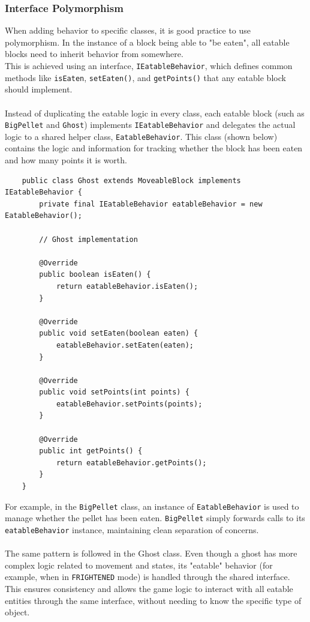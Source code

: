 \documentclass[a4paper,5pt]{article}
\begin{document}
\subsubsection{Interface Polymorphism}
When adding behavior to specific classes, it is good practice to use polymorphism. In the instance of a block being able to "be eaten", all eatable blocks need to inherit behavior from somewhere. \\This is achieved using an interface, \texttt{IEatableBehavior}, which defines common methods like \texttt{isEaten}, \texttt{setEaten()}, and \texttt{getPoints()} that any eatable block should implement. \\\\Instead of duplicating the eatable logic in every class, each eatable block (such as \texttt{BigPellet} and \texttt{Ghost}) implements \texttt{IEatableBehavior} and delegates the actual logic to a shared helper class, \texttt{EatableBehavior}. This class (shown below) contains the logic and information for tracking whether the block has been eaten and how many points it is worth.\newpage
\begin{verbatim}
    public class Ghost extends MoveableBlock implements IEatableBehavior {
        private final IEatableBehavior eatableBehavior = new EatableBehavior();

        // Ghost implementation

        @Override
        public boolean isEaten() {
            return eatableBehavior.isEaten();
        }
    
        @Override
        public void setEaten(boolean eaten) {
            eatableBehavior.setEaten(eaten);
        }
    
        @Override
        public void setPoints(int points) {
            eatableBehavior.setPoints(points);
        }
    
        @Override
        public int getPoints() {
            return eatableBehavior.getPoints();
        }
    }
\end{verbatim}

\noindent For example, in the \texttt{BigPellet} class, an instance of \texttt{EatableBehavior} is used to manage whether the pellet has been eaten. \texttt{BigPellet} simply forwards calls to its \texttt{eatableBehavior} instance, maintaining clean separation of concerns.\\\\The same pattern is followed in the Ghost class. Even though a ghost has more complex logic related to movement and states, its "eatable" behavior (for example, when in \texttt{FRIGHTENED} mode) is handled through the shared interface. This ensures consistency and allows the game logic to interact with all eatable entities through the same interface, without needing to know the specific type of object.
\end{document}
